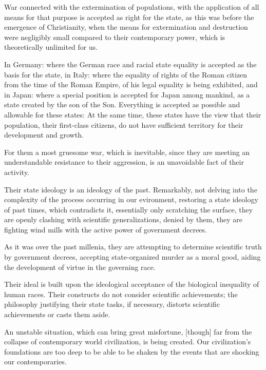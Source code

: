War connected with the extermination of populations, with the application of
all means for that purpose is accepted as right for the state, as this was
before the emergence of Christianity, when the means for extermination and
destruction were negligibly small compared to their contemporary power, which
is theoretically unlimited for us.

In Germany: where the German race and racial state equality is accepted as the
basis for the state, in Italy: where the equality of rights of the Roman
citizen from the time of the Roman Empire, of his legal equality is being
exhibited, and in Japan: where a special position is accepted for Japan among
mankind, as a state created by the son of the Son.  Everything is accepted as
possible and allowable for these states: 
At the same time, these states have the view that their population, their
first-class citizens, do not have sufficient territory for their development
and growth.

For them a most gruesome war, which is inevitable, since they are meeting an
understandable resistance to their aggression, is an unavoidable fact of their
activity.

Their state ideology is an ideology of the past.  Remarkably, not delving into
the complexity of the process occurring in our evironment, restoring a state
ideology of past times, which contradicts it, essentially only scratching the
surface, they are openly clashing with scientific generalizations, denied by
them, they are fighting wind mills with the active power of government decrees.

As it was over the past millenia, they are attempting to determine scientific
truth by government decrees, accepting state-organized murder as a moral good,
aiding the development of virtue in the governing race.

Their ideal is built upon the ideological acceptance of the biological
inequality of human races.  Their constructs do not consider scientific
achievements; the philosophy justifying their state tasks, if necessary,
distorts scientific achievements or casts them aside.


\Section %
An unstable situation, which can bring great misfortune, [though] far from the
collapse of contemporary world civilization, is being created.  Our
civilization's foundations are too deep to be able to be shaken by the events
that are shocking our contemporaries.

